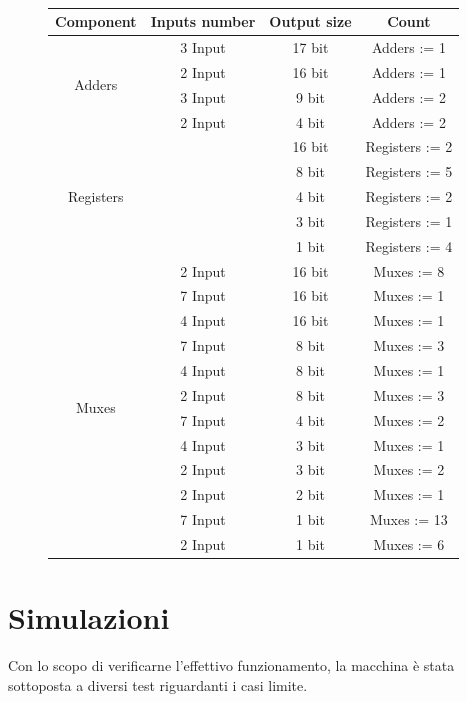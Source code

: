 \documentclass[11pt]{article}
\begin{document}
    \begin{figure}[h]
        \centering
        \tt
        \begin{tabular}{|c|c|c|c|}
        \hline
        Component & Inputs number & Output size & Count \\
        \hline
        \multirow{4}{4em}{Adders} & 3 Input & 17 bit & Adders := 1 \\
        & 2 Input & 16 bit & Adders := 1 \\
        & 3 Input & 9 bit & Adders := 2 \\
        & 2 Input & 4 bit & Adders := 2 \\
        \hline
        \multirow{5}{5em}{Registers} & & 16 bit & Registers := 2 \\
        & & 8 bit & Registers := 5 \\
        & & 4 bit & Registers := 2 \\
        & & 3 bit & Registers := 1 \\
        & & 1 bit & Registers := 4 \\
        \hline
        \multirow{12}{4em}{Muxes} & 2 Input & 16 bit & Muxes := 8 \\
        & 7 Input & 16 bit & Muxes := 1 \\
        & 4 Input & 16 bit & Muxes := 1 \\
        & 7 Input & 8 bit & Muxes := 3 \\
        & 4 Input & 8 bit & Muxes := 1 \\
        & 2 Input & 8 bit & Muxes := 3 \\
        & 7 Input & 4 bit & Muxes := 2 \\
        & 4 Input & 3 bit & Muxes := 1 \\
        & 2 Input & 3 bit & Muxes := 2 \\
        & 2 Input & 2 bit & Muxes := 1 \\
        & 7 Input & 1 bit & Muxes := 13 \\
        & 2 Input & 1 bit & Muxes := 6 \\
        \hline
        \end{tabular}
    \end{figure}

\section{Simulazioni}

    Con lo scopo di verificarne l'effettivo funzionamento, la macchina è stata sottoposta a diversi test riguardanti i casi limite.
    
\end{document}
